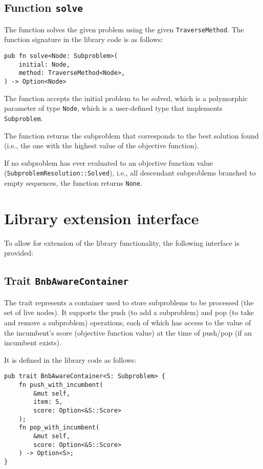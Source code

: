 \subsection{Function \texttt{solve}}

The function solves the given problem using the given \texttt{TraverseMethod}.
The function signature in the library code is as follows:

\begin{lstlisting}[caption=Function \texttt{Solve}]
pub fn solve<Node: Subproblem>(
    initial: Node,
    method: TraverseMethod<Node>,
) -> Option<Node>
\end{lstlisting}

The function accepts the initial problem to be solved, which is a polymorphic
parameter of type \texttt{Node}, which is a user-defined type that implements
\texttt{Subproblem}.

The function returns the subproblem that corresponds to the best solution found
(i.e., the one with the highest value of the objective function).

If no subproblem has ever evaluated to an objective function value
(\texttt{SubproblemResolution::Solved}), i.e., all descendant subproblems branched to empty
sequences, the function returns \texttt{None}.

\section{Library extension interface}

\label{sec:lib_extension_interface}

To allow for extension of the library functionality, the following interface is provided:

\subsection{Trait \texttt{BnbAwareContainer}}

The trait represents a container used to store subproblems to be processed
(the set of live nodes). It supports the push (to add a subproblem) and pop (to take and
remove a subproblem) operations, each of which has access to the value of the incumbent's
score (objective function value) at the time of push/pop (if an incumbent exists).

It is defined in the library code as follows:

\begin{lstlisting}[caption=Trait \texttt{BnbAwareContainer}]
pub trait BnbAwareContainer<S: Subproblem> {
    fn push_with_incumbent(
        &mut self,
        item: S,
        score: Option<&S::Score>
    );
    fn pop_with_incumbent(
        &mut self,
        score: Option<&S::Score>
    ) -> Option<S>;
}
\end{lstlisting}

